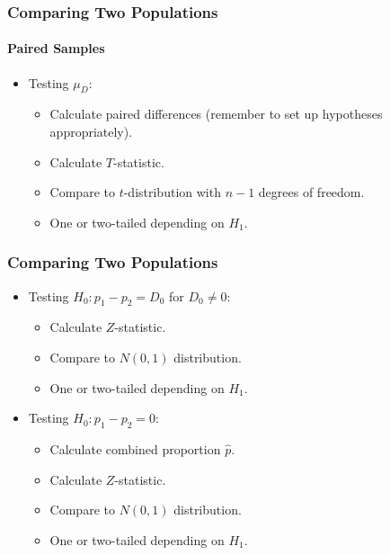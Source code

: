 \documentclass[12pt]{beamer}
\begin{document}
\begin{frame}
	\frametitle{Comparing Two Populations}
	\framesubtitle{Paired Samples}
	
	\begin{itemize}[label={\color{blue}$\blacktriangleright$}]
		\item Testing $\mu_D$:
		\begin{itemize}[label={\color{blue}$\blacktriangleright$}]
			\item Calculate paired differences (remember to set up hypotheses appropriately).
			\item Calculate $T$-statistic.
			\item Compare to $t$-distribution with $n - 1$ degrees of freedom.
			\item One or two-tailed depending on $H_1$.
		\end{itemize}
	\end{itemize}
	
\end{frame}
\begin{frame}
	\frametitle{Comparing Two Populations}
	
	\begin{itemize}[label={\color{blue}$\blacktriangleright$}]
		\item Testing $H_0 : p_1 - p_2 = D_0$ for $D_0 \neq 0$:
		\begin{itemize}[label={\color{blue}$\blacktriangleright$}]
			\item Calculate $Z$-statistic.
			\item Compare to $N(0,1)$ distribution.
			\item One or two-tailed depending on $H_1$.
		\end{itemize}
		
		\item Testing $H_0 : p_1 - p_2 = 0$:
		\begin{itemize}[label={\color{blue}$\blacktriangleright$}]
			\item Calculate combined proportion $\hat{p}$.
			\item Calculate $Z$-statistic.
			\item Compare to $N(0,1)$ distribution.
			\item One or two-tailed depending on $H_1$.
		\end{itemize}
	\end{itemize}
	
\end{frame}
\end{document}
